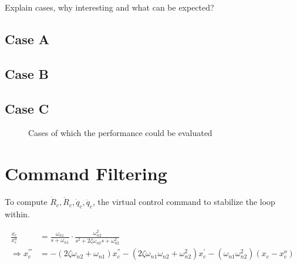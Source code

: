 Explain cases, why interesting and what can be expected?\\

\subsection{Case A}
\subsection{Case B}
\subsection{Case C}

\begin{figure}[h!]
	\centering
	\caption{Cases of which the performance could be evaluated \label{fig:routes}}
\end{figure}

\section{Command Filtering}
To compute $ \dot{R}_c, \ddot{R}_c,\dot{q}_c, \ddot{q}_c $, the virtual control command to stabilize the loop within. \cite{Farrell2009}

\begin{align}\label{eq:CF}
\frac{x_c}{x_c^o}&=\frac{\omega_{n1}}{s+\omega_{n1}}\cdot\frac{\omega_{n2}^2}{s^2+2\zeta\omega_{n2}s+\omega_{n2}^2}\\
\Rightarrow x_c^{'''}&=-(2\zeta\omega_{n2}+\omega_{n1})x_c^{''}-(2\zeta\omega_{n1}\omega_{n2}+\omega_{n2}^2)x_c^{'}-(\omega_{n1}\omega_{n2} ^2)(x_c-x_c^o)
\end{align}

